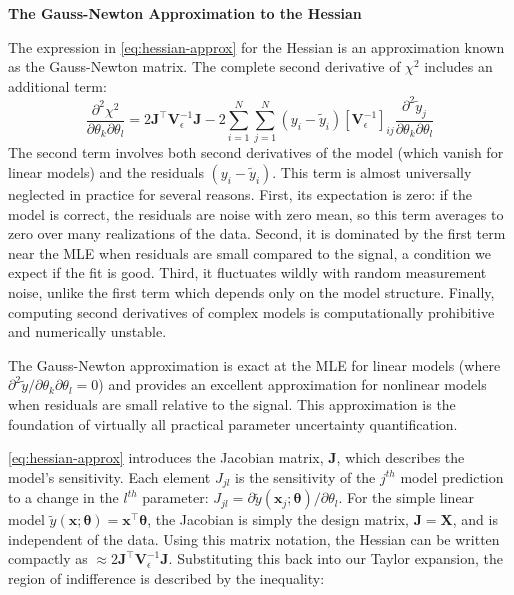 \begin{theoremBox}
    \textbf{The Gauss-Newton Approximation to the Hessian}
    
    The expression in \autoref{eq:hessian-approx} for the Hessian is an approximation known as the Gauss-Newton matrix. The complete second derivative of $\chi^2$ includes an additional term:
    \begin{equation}
        \frac{\partial^2 \chi^2}{\partial \theta_k \partial \theta_l} = 2\mathbf{J}^\top \mathbf{V}_\epsilon^{-1} \mathbf{J} - 2\sum_{i=1}^N \sum_{j=1}^N (y_i - \tilde{y}_i)[\mathbf{V}_\epsilon^{-1}]_{ij} \frac{\partial^2 \tilde{y}_j}{\partial \theta_k \partial \theta_l}
    \end{equation}
    The second term involves both second derivatives of the model (which vanish for linear models) and the residuals $(y_i - \tilde{y}_i)$. This term is almost universally neglected in practice for several reasons. First, its expectation is zero: if the model is correct, the residuals are noise with zero mean, so this term averages to zero over many realizations of the data. Second, it is dominated by the first term near the MLE when residuals are small compared to the signal, a condition we expect if the fit is good. Third, it fluctuates wildly with random measurement noise, unlike the first term which depends only on the model structure. Finally, computing second derivatives of complex models is computationally prohibitive and numerically unstable.
    
    The Gauss-Newton approximation is exact at the MLE for linear models (where $\partial^2 \tilde{y}/\partial \theta_k \partial \theta_l = 0$) and provides an excellent approximation for nonlinear models when residuals are small relative to the signal. This approximation is the foundation of virtually all practical parameter uncertainty quantification.
\end{theoremBox}
\autoref{eq:hessian-approx} introduces the Jacobian matrix, $\mathbf{J}$, which describes the model's sensitivity. Each element $J_{jl}$ is the sensitivity of the $j^{th}$ model prediction to a change in the $l^{th}$ parameter: $J_{jl} = \partial \tilde{y}(\mathbf{x}_j; \boldsymbol{\theta}) / \partial \theta_l$. For the simple linear model $\tilde{y}(\mathbf{x}; \boldsymbol{\theta}) = \mathbf{x}^\top \boldsymbol{\theta}$, the Jacobian is simply the design matrix, $\mathbf{J} = \mathbf{X}$, and is independent of the data. Using this matrix notation, the Hessian can be written compactly as $\approx 2\mathbf{J}^\top \mathbf{V}_\epsilon^{-1} \mathbf{J}$. Substituting this back into our Taylor expansion, the region of indifference is described by the inequality:
